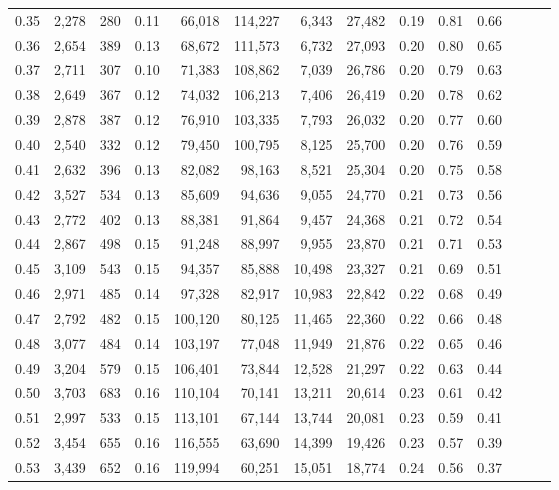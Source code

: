\begin{tabular}{rrrrrrrrrrrrrr}
0.35 &  2,278 &  280 &  0.11 &   66,018 &  114,227 &   6,343 &  27,482 &  0.19 &  0.81 &      0.66 \\
0.36 &  2,654 &  389 &  0.13 &   68,672 &  111,573 &   6,732 &  27,093 &  0.20 &  0.80 &      0.65 \\
0.37 &  2,711 &  307 &  0.10 &   71,383 &  108,862 &   7,039 &  26,786 &  0.20 &  0.79 &      0.63 \\
0.38 &  2,649 &  367 &  0.12 &   74,032 &  106,213 &   7,406 &  26,419 &  0.20 &  0.78 &      0.62 \\
0.39 &  2,878 &  387 &  0.12 &   76,910 &  103,335 &   7,793 &  26,032 &  0.20 &  0.77 &      0.60 \\
0.40 &  2,540 &  332 &  0.12 &   79,450 &  100,795 &   8,125 &  25,700 &  0.20 &  0.76 &      0.59 \\
0.41 &  2,632 &  396 &  0.13 &   82,082 &   98,163 &   8,521 &  25,304 &  0.20 &  0.75 &      0.58 \\
0.42 &  3,527 &  534 &  0.13 &   85,609 &   94,636 &   9,055 &  24,770 &  0.21 &  0.73 &      0.56 \\
0.43 &  2,772 &  402 &  0.13 &   88,381 &   91,864 &   9,457 &  24,368 &  0.21 &  0.72 &      0.54 \\
0.44 &  2,867 &  498 &  0.15 &   91,248 &   88,997 &   9,955 &  23,870 &  0.21 &  0.71 &      0.53 \\
0.45 &  3,109 &  543 &  0.15 &   94,357 &   85,888 &  10,498 &  23,327 &  0.21 &  0.69 &      0.51 \\
0.46 &  2,971 &  485 &  0.14 &   97,328 &   82,917 &  10,983 &  22,842 &  0.22 &  0.68 &      0.49 \\
0.47 &  2,792 &  482 &  0.15 &  100,120 &   80,125 &  11,465 &  22,360 &  0.22 &  0.66 &      0.48 \\
0.48 &  3,077 &  484 &  0.14 &  103,197 &   77,048 &  11,949 &  21,876 &  0.22 &  0.65 &      0.46 \\
0.49 &  3,204 &  579 &  0.15 &  106,401 &   73,844 &  12,528 &  21,297 &  0.22 &  0.63 &      0.44 \\
0.50 &  3,703 &  683 &  0.16 &  110,104 &   70,141 &  13,211 &  20,614 &  0.23 &  0.61 &      0.42 \\
0.51 &  2,997 &  533 &  0.15 &  113,101 &   67,144 &  13,744 &  20,081 &  0.23 &  0.59 &      0.41 \\
0.52 &  3,454 &  655 &  0.16 &  116,555 &   63,690 &  14,399 &  19,426 &  0.23 &  0.57 &      0.39 \\
0.53 &  3,439 &  652 &  0.16 &  119,994 &   60,251 &  15,051 &  18,774 &  0.24 &  0.56 &      0.37 \\

\end{tabular}
